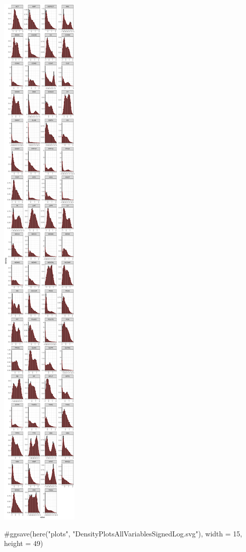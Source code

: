 \documentclass[
  letterpaper,
  DIV=11,
  numbers=noendperiod]{scrreprt}
\newenvironment{Shaded}{\begin{snugshade}}{\end{snugshade}}
\newcommand{\CommentTok}[1]{\textcolor[rgb]{0.37,0.37,0.37}{#1}}
\begin{document}
\includegraphics{AppendixG_files/figure-pdf/signed.log.transformation-distributions-1.pdf}

\begin{Shaded}
\begin{Highlighting}[]
\CommentTok{\#ggsave(here("plots", "DensityPlotsAllVariablesSignedLog.svg"), width = 15, height = 49)}
\end{Highlighting}
\end{Shaded}
\end{document}
